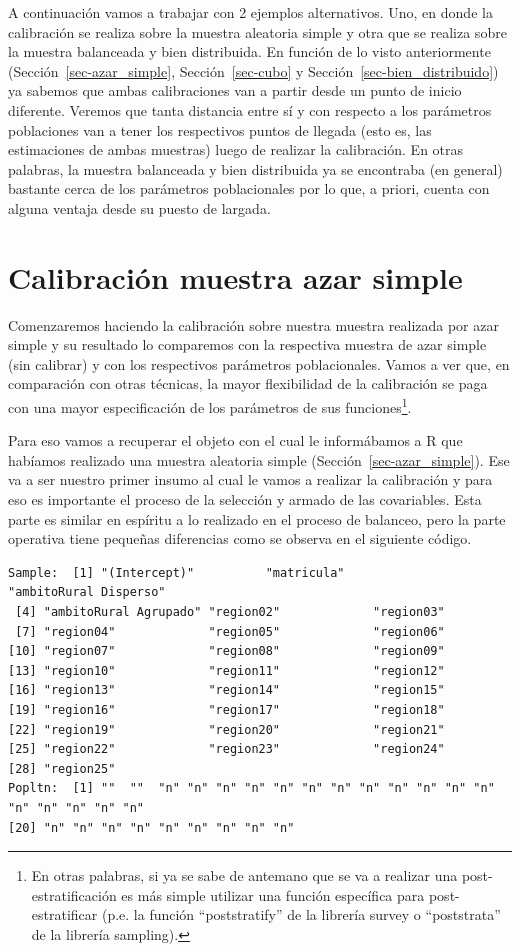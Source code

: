 \documentclass[
  spanish,
  a4paper,
]{scrreprt}
\begin{document}
A continuación vamos a trabajar con 2 ejemplos alternativos. Uno, en
donde la calibración se realiza sobre la muestra aleatoria simple y otra
que se realiza sobre la muestra balanceada y bien distribuida. En
función de lo visto anteriormente (Sección~\ref{sec-azar_simple},
Sección~\ref{sec-cubo} y Sección~\ref{sec-bien_distribuido}) ya sabemos
que ambas calibraciones van a partir desde un punto de inicio diferente.
Veremos que tanta distancia entre sí y con respecto a los parámetros
poblaciones van a tener los respectivos puntos de llegada (esto es, las
estimaciones de ambas muestras) luego de realizar la calibración. En
otras palabras, la muestra balanceada y bien distribuida ya se
encontraba (en general) bastante cerca de los parámetros poblacionales
por lo que, a priori, cuenta con alguna ventaja desde su puesto de
largada.

\section{Calibración muestra azar
simple}\label{calibraciuxf3n-muestra-azar-simple}

Comenzaremos haciendo la calibración sobre nuestra muestra realizada por
azar simple y su resultado lo comparemos con la respectiva muestra de
azar simple (sin calibrar) y con los respectivos parámetros
poblacionales. Vamos a ver que, en comparación con otras técnicas, la
mayor flexibilidad de la calibración se paga con una mayor
especificación de los parámetros de sus funciones\footnote{En otras
  palabras, si ya se sabe de antemano que se va a realizar una
  post-estratificación es más simple utilizar una función específica
  para post-estratificar (p.e. la función ``poststratify'' de la
  librería survey o ``poststrata'' de la librería sampling).}.

Para eso vamos a recuperar el objeto con el cual le informábamos a R que
habíamos realizado una muestra aleatoria simple
(Sección~\ref{sec-azar_simple}). Ese va a ser nuestro primer insumo al
cual le vamos a realizar la calibración y para eso es importante el
proceso de la selección y armado de las covariables. Esta parte es
similar en espíritu a lo realizado en el proceso de balanceo, pero la
parte operativa tiene pequeñas diferencias como se observa en el
siguiente código.

\begin{verbatim}
Sample:  [1] "(Intercept)"          "matricula"            "ambitoRural Disperso"
 [4] "ambitoRural Agrupado" "region02"             "region03"            
 [7] "region04"             "region05"             "region06"            
[10] "region07"             "region08"             "region09"            
[13] "region10"             "region11"             "region12"            
[16] "region13"             "region14"             "region15"            
[19] "region16"             "region17"             "region18"            
[22] "region19"             "region20"             "region21"            
[25] "region22"             "region23"             "region24"            
[28] "region25"            
Popltn:  [1] ""  ""  "n" "n" "n" "n" "n" "n" "n" "n" "n" "n" "n" "n" "n" "n" "n" "n" "n"
[20] "n" "n" "n" "n" "n" "n" "n" "n" "n"
\end{verbatim}
\end{document}
